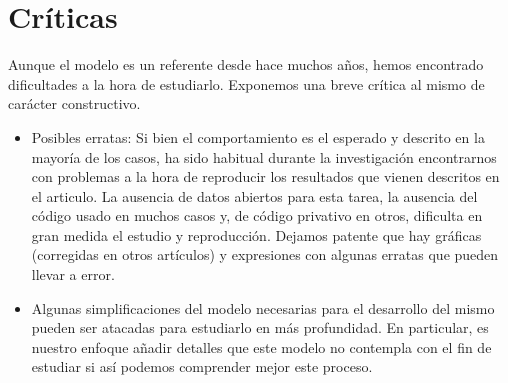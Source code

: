 \section{Críticas}
Aunque el modelo es un referente desde hace muchos años, hemos encontrado dificultades a la hora de estudiarlo. Exponemos una breve crítica al mismo de carácter constructivo.
\begin{itemize}
	\item Posibles erratas: Si bien el comportamiento es el esperado y descrito en la mayoría de los casos, ha sido habitual durante la investigación encontrarnos con problemas a la hora de reproducir los resultados que vienen descritos en el articulo. 
	La ausencia de datos abiertos para esta tarea, la ausencia del código usado en muchos casos y, de código privativo en otros, dificulta en gran medida el estudio y reproducción. Dejamos patente que hay gráficas (corregidas en otros artículos) y expresiones con algunas erratas que pueden llevar a error.
	
	\item Algunas simplificaciones del modelo necesarias para el desarrollo del mismo pueden ser atacadas para estudiarlo en más profundidad. En particular, es nuestro enfoque añadir detalles que este modelo no contempla con el fin de estudiar si así podemos comprender mejor este proceso. 
\end{itemize}



